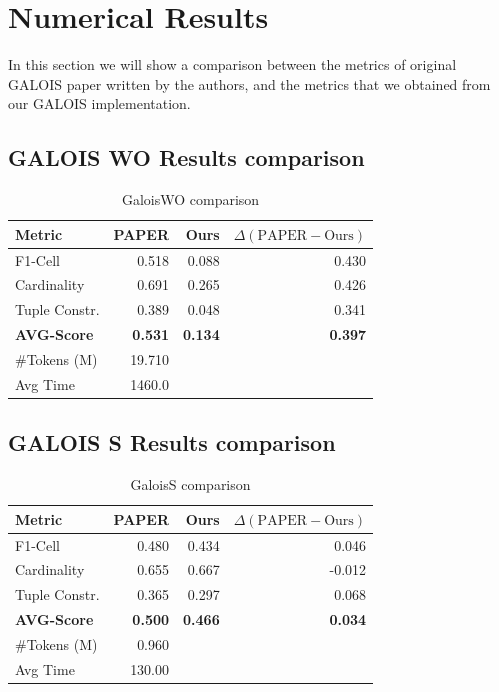 \section{Numerical Results}
In this section we will show a comparison between the metrics of original GALOIS paper written by the authors, and the metrics that we obtained from our GALOIS implementation.

\subsection{GALOIS WO Results comparison}

\begin{table}[H] %
\centering
\begin{tabular}{lrrr}
\hline
Metric & PAPER & Ours & $\Delta(\text{PAPER} - \text{Ours})$ \\
\hline
F1-Cell       & 0.518 & 0.088 & 0.430 \\
Cardinality   & 0.691 & 0.265 & 0.426 \\
Tuple Constr. & 0.389 & 0.048 & 0.341 \\
\textbf{AVG-Score} & \textbf{0.531} & \textbf{0.134} & \textbf{0.397} \\
\#Tokens (M)  & 19.710 &      &       \\
Avg Time      & 1460.0 &      &       \\
\hline
\end{tabular}
\caption{GaloisWO comparison}
\label{galoisWO_results}
\end{table}

\subsection{GALOIS S Results comparison}

\begin{table}[H]
\centering
\begin{tabular}{lrrr}
\hline
Metric & PAPER & Ours & $\Delta(\text{PAPER} - \text{Ours})$ \\
\hline
F1-Cell       & 0.480 & 0.434 & 0.046 \\
Cardinality   & 0.655 & 0.667 & -0.012 \\
Tuple Constr. & 0.365 & 0.297 & 0.068 \\
\textbf{AVG-Score} & \textbf{0.500} & \textbf{0.466} & \textbf{0.034} \\
\#Tokens (M)  & 0.960 &      &       \\
Avg Time      & 130.00 &     &       \\
\hline
\end{tabular}
\caption{GaloisS comparison}
\label{galoiss_results}
\end{table}

